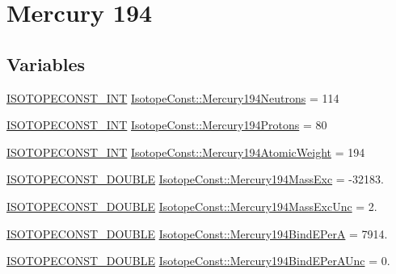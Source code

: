 \hypertarget{group___isotope_const-_mercury-_hg194}{}\section{Mercury 194}
\label{group___isotope_const-_mercury-_hg194}
\subsection*{Variables}
\begin{DoxyCompactItemize}
\item 
\mbox{\hyperlink{group___isotope_const-_macros_ga5f18360b3e99483a35c32d789e62621c}{I\+S\+O\+T\+O\+P\+E\+C\+O\+N\+S\+T\+\_\+\+I\+NT}} \mbox{\hyperlink{group___isotope_const-_mercury-_hg194_gad871e1a8bee28a17c706f7f4f2bf7efe}{Isotope\+Const\+::\+Mercury194\+Neutrons}} = 114
\item 
\mbox{\hyperlink{group___isotope_const-_macros_ga5f18360b3e99483a35c32d789e62621c}{I\+S\+O\+T\+O\+P\+E\+C\+O\+N\+S\+T\+\_\+\+I\+NT}} \mbox{\hyperlink{group___isotope_const-_mercury-_hg194_ga9276e986bb5792d9e0ddb70a5b84a0b7}{Isotope\+Const\+::\+Mercury194\+Protons}} = 80
\item 
\mbox{\hyperlink{group___isotope_const-_macros_ga5f18360b3e99483a35c32d789e62621c}{I\+S\+O\+T\+O\+P\+E\+C\+O\+N\+S\+T\+\_\+\+I\+NT}} \mbox{\hyperlink{group___isotope_const-_mercury-_hg194_gab085cfba055fdd9612847df7e4d4553d}{Isotope\+Const\+::\+Mercury194\+Atomic\+Weight}} = 194
\item 
\mbox{\hyperlink{group___isotope_const-_macros_ga8f45a7272ce02c0b4c65c44636ed719a}{I\+S\+O\+T\+O\+P\+E\+C\+O\+N\+S\+T\+\_\+\+D\+O\+U\+B\+LE}} \mbox{\hyperlink{group___isotope_const-_mercury-_hg194_gafc37605c0c931d3d07972ad6bf4dd682}{Isotope\+Const\+::\+Mercury194\+Mass\+Exc}} = -\/32183.
\item 
\mbox{\hyperlink{group___isotope_const-_macros_ga8f45a7272ce02c0b4c65c44636ed719a}{I\+S\+O\+T\+O\+P\+E\+C\+O\+N\+S\+T\+\_\+\+D\+O\+U\+B\+LE}} \mbox{\hyperlink{group___isotope_const-_mercury-_hg194_ga6fc8976e3786d9041737e7042a890e11}{Isotope\+Const\+::\+Mercury194\+Mass\+Exc\+Unc}} = 2.
\item 
\mbox{\hyperlink{group___isotope_const-_macros_ga8f45a7272ce02c0b4c65c44636ed719a}{I\+S\+O\+T\+O\+P\+E\+C\+O\+N\+S\+T\+\_\+\+D\+O\+U\+B\+LE}} \mbox{\hyperlink{group___isotope_const-_mercury-_hg194_ga66e7c14a3b0acaeaf395060b6e25991c}{Isotope\+Const\+::\+Mercury194\+Bind\+E\+PerA}} = 7914.
\item 
\mbox{\hyperlink{group___isotope_const-_macros_ga8f45a7272ce02c0b4c65c44636ed719a}{I\+S\+O\+T\+O\+P\+E\+C\+O\+N\+S\+T\+\_\+\+D\+O\+U\+B\+LE}} \mbox{\hyperlink{group___isotope_const-_mercury-_hg194_ga132a7993e5cdfc269924cc1b4c855435}{Isotope\+Const\+::\+Mercury194\+Bind\+E\+Per\+A\+Unc}} = 0.

\end{DoxyCompactItemize}
